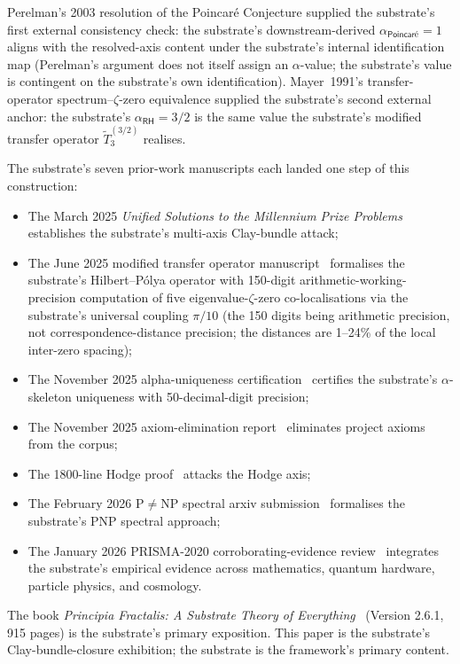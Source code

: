 \documentclass[11pt,a4paper]{amsart}
\theoremstyle{plain}
\theoremstyle{definition}
\begin{document}
Perelman's 2003 resolution of the Poincar\'e Conjecture supplied the substrate's first external consistency check: the substrate's downstream-derived $\alpha_{\textsf{Poincar\'e}}=1$ aligns with the resolved-axis content under the substrate's internal identification map (Perelman's argument does not itself assign an $\alpha$-value; the substrate's value is contingent on the substrate's own identification). Mayer~1991's transfer-operator spectrum--$\zeta$-zero equivalence supplied the substrate's second external anchor: the substrate's $\alpha_{\textsf{RH}}=3/2$ is the same value the substrate's modified transfer operator $\widetilde{T}_3^{(3/2)}$ realises.

The substrate's seven prior-work manuscripts each landed one step of this construction:
\begin{itemize}[itemsep=2pt]
\item The March 2025 \emph{Unified Solutions to the Millennium Prize Problems}~\cite{cohen2025unifiedClay} establishes the substrate's multi-axis Clay-bundle attack;
\item The June 2025 modified transfer operator manuscript~\cite{cohen2025transferOp} formalises the substrate's Hilbert--P\'olya operator with 150-digit arithmetic-working-precision computation of five eigenvalue-$\zeta$-zero co-localisations via the substrate's universal coupling $\pi/10$ (the 150 digits being arithmetic precision, not correspondence-distance precision; the distances are 1--24\% of the local inter-zero spacing);
\item The November 2025 alpha-uniqueness certification~\cite{cohen2025alphaUniqueness} certifies the substrate's $\alpha$-skeleton uniqueness with 50-decimal-digit precision;
\item The November 2025 axiom-elimination report~\cite{cohen2025axiomElim} eliminates project axioms from the corpus;
\item The 1800-line Hodge proof~\cite{cohen2025hodgeProof} attacks the Hodge axis;
\item The February 2026 P$\neq$NP spectral arxiv submission~\cite{cohen2026pnpSpectral} formalises the substrate's PNP spectral approach;
\item The January 2026 PRISMA-2020 corroborating-evidence review~\cite{cohen2026corroborating} integrates the substrate's empirical evidence across mathematics, quantum hardware, particle physics, and cosmology.
\end{itemize}

The book \emph{Principia Fractalis: A Substrate Theory of Everything}~\cite{cohen2026book} (Version 2.6.1, 915 pages) is the substrate's primary exposition. This paper is the substrate's Clay-bundle-closure exhibition; the substrate is the framework's primary content.
\end{document}
